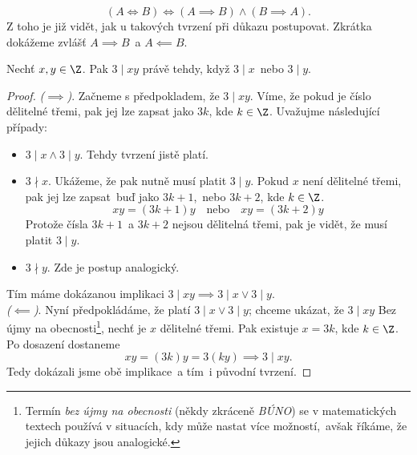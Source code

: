 \begin{equation*}
    (A \iff B) \iff (A \implies B) \land (B \implies A).
\end{equation*}
Z toho je již vidět, jak u takových tvrzení při důkazu postupovat. Zkrátka dokážeme zvlášť $A \implies B$~a $A \impliedby B$.
\begin{proposition}
    Nechť $x,y\in\Z$. Pak $3 \mid xy$ právě tehdy, když $3 \mid x$~nebo $3 \mid y$.
\end{proposition}
\begin{proof}
    \textit{($\implies$)}. Začneme s předpokladem, že $3 \mid xy$. Víme, že pokud je číslo dělitelné třemi, pak jej lze zapsat jako $3k$, kde $k\in\Z$. Uvažujme následující případy:
    \begin{itemize}
        \item $3 \mid x \land 3 \mid y$. Tehdy tvrzení jistě platí.
        \item $3 \nmid x$. Ukážeme, že pak nutně musí platit $3 \mid y$. Pokud $x$ není dělitelné třemi, pak jej lze zapsat~buď jako $3k+1$,~nebo $3k+2$, kde $k\in\Z$. 
        \begin{equation*}
            xy=(3k+1)y\quad\text{nebo}\quad xy=(3k+2)y
        \end{equation*}
        Protože čísla $3k+1$~a $3k+2$ nejsou dělitelná třemi, pak je vidět, že musí platit $3 \mid y$.
        \item $3 \nmid y$. Zde je postup analogický. 
    \end{itemize}
    Tím máme dokázanou implikaci $3 \mid xy \implies 3 \mid x \lor 3 \mid y$.\\
    \textit{($\impliedby$)}. Nyní předpokládáme, že platí $3 \mid x \lor 3 \mid y$; chceme ukázat, že $3 \mid xy$ Bez újmy na obecnosti\footnote{Termín \emph{bez újmy na obecnosti} (někdy zkráceně \emph{BÚNO}) se v matematických textech používá v situacích, kdy může nastat více možností,~avšak říkáme, že jejich důkazy jsou analogické.}, nechť je $x$ dělitelné třemi. Pak existuje $x=3k$, kde $k\in\Z$. Po dosazení dostaneme
    \begin{equation*}
        xy=(3k)y=3(ky) \implies 3 \mid xy.
    \end{equation*}
    Tedy dokázali jsme obě implikace~a tím~i původní tvrzení.
\end{proof}

